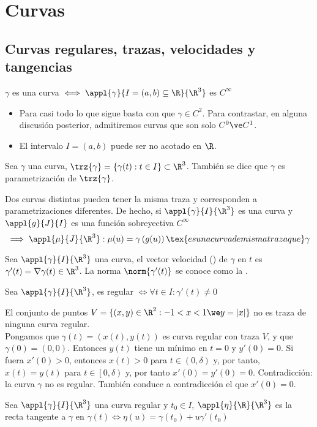 \section{Curvas}

\subsection{Curvas regulares, trazas, velocidades y tangencias}
\begin{defn}[Curva]
	$\gamma$ es una curva $\iff \appl{\gamma}{I=(a,b)\subseteq\R}{\R^3}$ es $C^{\infty}$
	\begin{itemize}
		\item Para casi todo lo que sigue basta con que $\gamma \in C^2$. Para contrastar, en alguna discusión posterior, admitiremos curvas que son solo $C^0 \ve C^1$.
		\item El intervalo $I = (a,b)$ puede ser no acotado en $\R$.
	\end{itemize}
\end{defn}
\begin{defn}[Traza]
	Sea $\gamma$ una curva, $\trz{\gamma}=\{\gamma(t):t\in I\}\subset \R^3$. También se dice que $\gamma$ es parametrización de $\trz{\gamma}$.
\end{defn}

\begin{obs}
	Dos curvas distintas pueden tener la misma traza y corresponden a parametrizaciones diferentes. De hecho, si $\appl{\gamma}{I}{\R^3}$ es una curva y $\appl{g}{J}{I}$ es una función sobreyectiva $C^{\infty}$
	\[\implies \appl{\mu}{J}{\R^3} : \mu(u)=\gamma\left(g(u)\right)\tex{ es una curva de misma traza que } \gamma\]
\end{obs}
\begin{defn}
	Sea $\appl{\gamma}{I}{\R^3}$ una curva, el vector velocidad () de $\gamma$ en $t$ es $\gamma'(t)=\nabla\gamma(t)\in \R^3$. La norma $\norm{\gamma'(t)}$ se conoce como la .
\end{defn}
\begin{defn}
	Sea $\appl{\gamma}{I}{\R^3}$, es regular $\iff \forall t \in I : \gamma'(t)\ne 0$
\end{defn}
\begin{ejem}
	El conjunto de puntos $V=\{(x, y)\in \R^2:-1<x<1\we y=|x|\}$ no es traza de ninguna curva regular.\\
	\indent Pongamos que $\gamma(t)=(x(t), y(t))$ es curva regular con traza $V$, y que $\gamma(0)=(0,0)$. Entonces $y(t)$ tiene un mínimo en $t = 0$ y $y'(0) = 0$. Si fuera $x'(0) > 0$, entonces $x(t) > 0$ para $t \in (0, \delta)$ y, por tanto, $x(t) =y(t)$ para $t \in \left[0, \delta\right)$ y, por tanto $x'(0) = y'(0) = 0$. Contradicción: la curva $\gamma$ no es regular. También conduce a contradicción el que $x'(0) = 0$.
\end{ejem}
\begin{defn}
	Sea $\appl{\gamma}{I}{\R^3}$ una curva regular y $t_0\in I$, $\appl{\eta}{\R}{\R^3}$ es la recta tangente a $\gamma$ en $\gamma(t) \iff \eta(u)=\gamma(t_0)+u\gamma'(t_0)$
\end{defn}

